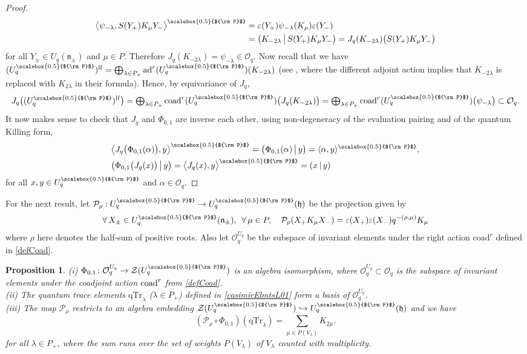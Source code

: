 \documentclass[11pt]{amsart}
\newtheorem{prop}[teo]{Proposition}
\newcommand{\Oo}{\mathcal{O}}
\newcommand{\Pup}{{\scalebox{0.5}{${\rm P}$}}}
\begin{document}
\begin{proof}
\begin{align*}
\begin{split}
\bigl\langle \psi_{-\lambda}, S(Y_+)K_\mu Y_-\bigr\rangle^\Pup &= \varepsilon(Y_+) \psi_{-\lambda}(K_\mu)\varepsilon(Y_-)\\
&= \bigl( K_{-2\lambda} \,\big|\, S(Y_+)K_\mu Y_- \bigr) = J_q(K_{-2\lambda})\bigl( S(Y_+)K_\mu Y_- \bigr)
\end{split}
\end{align*}
for all $Y_\pm\in U_q(\mathfrak{n}_\pm)$ and $\mu \in P$. Therefore $J_q(K_{-2\lambda}) = \psi_{-\lambda} \in \mathcal{O}_q$. Now recall that we have $(U_q^\Pup)^{\rm lf} = \textstyle \bigoplus_{\lambda\in P_+} \mathrm{ad}^r(U_q^\Pup)(K_{-2\lambda})$ (see \cite[Th.\,3.113]{VY}, where the different adjoint action implies that $K_{-2\lambda}$ is replaced with $K_{2\lambda}$ in their formula). Hence, by equivariance of $J_q$,
\[ J_q\bigl( (U_q^\Pup)^{\rm lf} \bigr) = \textstyle \bigoplus_{\lambda\in P_+} \mathrm{coad}^r(U_q^\Pup)\bigl( J_q(K_{-2\lambda}) \bigr) = \bigoplus_{\lambda\in P_+} \mathrm{coad}^r(U_q^\Pup)\bigl( \psi_{-\lambda} \bigr) \subset \mathcal{O}_q. \]
It now makes sense to check that $J_q$ and $\Phi_{0,1}$ are inverse each other, using non-degeneracy of the evaluation pairing and of the quantum Killing form,
\begin{align*}
&\bigl\langle J_q\bigl( \Phi_{0,1}(\alpha) \bigr), y \bigr\rangle^\Pup = \bigl( \Phi_{0,1}(\alpha) \,\big|\, y \bigr) = \langle \alpha, y \rangle^\Pup,\\
&\bigl( \Phi_{0,1}\bigl(J_q(x)\bigr) \,\big|\, y \bigr) = \bigl\langle J_q(x), y \bigr\rangle^\Pup = (x \,|\,y)
\end{align*}
for all $x,y\in U_q^\Pup$ and $\alpha \in \mathcal{O}_q$.
\end{proof}

For the next result, let $\mathcal{P}_\rho :  U_q^\Pup \to U_q^\Pup(\mathfrak{h})$ be the projection given by
\[ \forall \, X_\pm \in U_q^\Pup(\mathfrak{n}_\pm), \:\: \forall \, \mu \in P, \quad \mathcal{P}_\rho(X_+ K_\mu X_-) = \varepsilon(X_+)\varepsilon(X_-)q^{-(\rho,\mu)}K_\mu \]
where $\rho$ here denotes the half-sum of positive roots. Also let $\mathcal{O}_q^{U_q}$ be the subspace of invariant elements under the right action $\mathrm{coad}^r$ defined in \eqref{defCoad}. 

\begin{prop}\label{propPropietesPhi01App}
(i) $\Phi_{0,1}\colon \Oo_q^{U_q}\to \mathcal{Z}(U_q^\Pup)$ is an algebra isomorphism, where $\Oo_q^{U_q} \subset \Oo_q$ is the subspace of invariant elements under the coadjoint action ${\rm coad}^r$ from \eqref{defCoad}. 
\\(ii) The quantum trace elements $\mathrm{qTr}_\lambda $ ($\lambda \in P_+$) defined in \eqref{casimirElmtsL01} form a basis of $\Oo_q^{U_q}$.
\\(iii) The map $\mathcal{P}_\rho$ restricts to an algebra embedding $\mathcal{Z}(U_q^\Pup) \hookrightarrow U_q^\Pup(\mathfrak{h})$ and we have
\[ (\mathcal{P}_\rho \circ \Phi_{0,1})(\mathrm{qTr}_\lambda) = \sum_{\mu \in P(V_\lambda)} K_{2\mu}. \]
for all $\lambda \in P_+$, where the sum runs over the set of weights $P(V_\lambda)$ of $V_\lambda$ counted with multiplicity.  
\end{prop}
\end{document}
